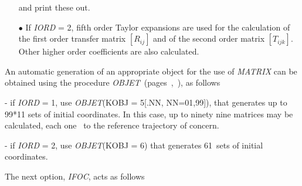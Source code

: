 \begin{itemize}
\noindent and print these out. 

\item[$\bullet$] If \textsl{IORD} = 2, fifth order Taylor expansions are used for the 
calculation of the first order transfer matrix $ [R_{ij}] $ and of 
the second order matrix $[T_{ijk}]$.  Other higher order coefficients are also calculated. 
\end{itemize}

\medskip

\noindent An automatic generation of an appropriate object for the use of \textsl{MATRIX}  can be obtained 
using the procedure \textsl{OBJET}~(pages~\pageref{OBJET},~\pageref{OBJET-B}), as follows

\noindent - if  \textsl{IORD} = 1, use \textsl{OBJET}(KOBJ = 5[.NN, NN=01,99]), 
that generates up to 99*11 sets of initial coordinates. In this case, up to ninety nine matrices 
may be calculated, each one \wrt\ to the reference trajectory of concern. 

\noindent - if  \textsl{IORD} = 2, use \textsl{OBJET}(KOBJ = 6)  that generates 
  61~sets of initial coordinates. 


\medskip

\noindent The next option, \textsl{IFOC}, acts as follows \par


